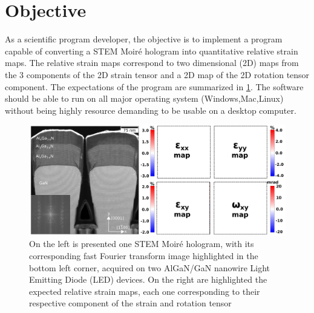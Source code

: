 \documentclass{article}
\begin{document}
\section{Objective}
As a scientific program developer, the objective is to implement a program 
capable of converting a STEM Moir{\'e} hologram into quantitative relative 
strain maps. The relative strain maps correspond to two dimensional (2D) maps 
from the 3 components of the 2D strain tensor and a 2D map of the 2D rotation 
tensor component. The expectations of the program are summarized in 
\cref{fig:STEM_Moire_GPA_Objective}. The software should be able to run on all 
major operating system (Windows,Mac,Linux) without being highly resource 
demanding to be usable on a desktop computer.
\begin{figure}[H]
	\centering
	\includegraphics[width=\linewidth]{Figures/STEM_Moire_GPA_objective.png}
	\caption[STEM Moir{\'e} GPA objective]{On the left is presented one STEM 
Moir{\'e} hologram, with its corresponding fast Fourier transform image 
highlighted in the bottom left corner, acquired on two AlGaN/GaN nanowire Light 
Emitting Diode (LED) devices. On the right are highlighted the expected relative 
strain maps, each one corresponding to their respective component of the strain 
and rotation tensor}
	\label{fig:STEM_Moire_GPA_Objective}
\end{figure}
\end{document}
